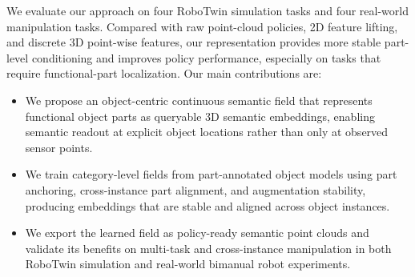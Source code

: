 We evaluate our approach on four RoboTwin simulation tasks and four real-world manipulation tasks. Compared with raw point-cloud policies, 2D feature lifting, and discrete 3D point-wise features, our representation provides more stable part-level conditioning and improves policy performance, especially on tasks that require functional-part localization. Our main contributions are:
\begin{itemize}
    \item We propose an object-centric continuous semantic field that represents functional object parts as queryable 3D semantic embeddings, enabling semantic readout at explicit object locations rather than only at observed sensor points.

    \item We train category-level fields from part-annotated object models using part anchoring, cross-instance part alignment, and augmentation stability, producing embeddings that are stable and aligned across object instances.

    \item We export the learned field as policy-ready semantic point clouds and validate its benefits on multi-task and cross-instance manipulation in both RoboTwin simulation and real-world bimanual robot experiments.
\end{itemize}
